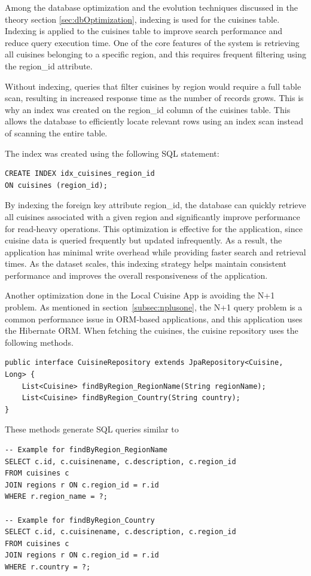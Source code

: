 Among the database optimization and the evolution techniques discussed in the theory section \ref{sec:dbOptimization}, indexing is used for the 
cuisines table. Indexing is applied to the cuisines table to improve search performance and reduce query execution time.
One of the core features of the system is retrieving all cuisines belonging to a specific region, and this requires frequent filtering using the region\_id attribute.

Without indexing, queries that filter cuisines by region would require a full table scan, resulting in increased response time as the number of records grows.
This is why an index was created on the region\_id column of the cuisines table. This allows the database to efficiently
locate relevant rows using an index scan instead of scanning the entire table.

The index was created using the following SQL statement:

\begin{verbatim}
CREATE INDEX idx_cuisines_region_id
ON cuisines (region_id);
\end{verbatim}

By indexing the foreign key attribute region\_id, the database can quickly retrieve all
cuisines associated with a given region and significantly improve performance for read-heavy operations.
This optimization is effective for the application, since cuisine data is queried frequently but updated infrequently.
As a result, the application has minimal write overhead while providing faster search and retrieval times. As the dataset scales, this indexing strategy
helps maintain consistent performance and improves the overall responsiveness of the application.

Another optimization done in the Local Cuisine App is avoiding the N+1 problem.
As mentioned in section~\ref{subsec:nplusone}, the N+1 query problem is a common performance issue in ORM-based applications, and this application uses the Hibernate ORM.
When fetching the cuisines, the cuisine repository uses the following methods.

\begin{verbatim}
public interface CuisineRepository extends JpaRepository<Cuisine, Long> {
    List<Cuisine> findByRegion_RegionName(String regionName);
    List<Cuisine> findByRegion_Country(String country);
}
\end{verbatim}

These methods generate SQL queries similar to 

\begin{verbatim}
-- Example for findByRegion_RegionName
SELECT c.id, c.cuisinename, c.description, c.region_id
FROM cuisines c
JOIN regions r ON c.region_id = r.id
WHERE r.region_name = ?;

-- Example for findByRegion_Country
SELECT c.id, c.cuisinename, c.description, c.region_id
FROM cuisines c
JOIN regions r ON c.region_id = r.id
WHERE r.country = ?;
\end{verbatim}

